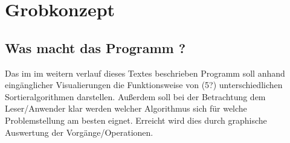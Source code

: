 \chapter{Grobkonzept}
\label{chap:basic_concept}

\section{Was macht das Programm ?}

Das im im weitern verlauf dieses Textes beschrieben Programm soll anhand eingänglicher
Visualierungen die Funktionsweise von (5?) unterschiedlichen Sortieralgorithmen
darstellen. Außerdem soll bei der Betrachtung dem Leser/Anwender klar werden welcher Algorithmus 
sich für welche Problemstellung am besten eignet. Erreicht wird dies durch graphische Auswertung der
Vorgänge/Operationen.
